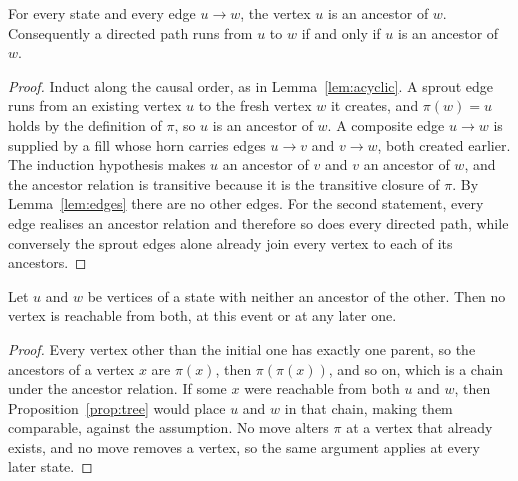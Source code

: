 \begin{proposition}
\label{prop:tree}
For every state and every edge $u \to w$, the vertex $u$ is an ancestor of $w$.
Consequently a directed path runs from $u$ to $w$ if and only if $u$ is an ancestor of $w$.
\end{proposition}

\begin{proof}
Induct along the causal order, as in Lemma~\ref{lem:acyclic}.
A sprout edge runs from an existing vertex $u$ to the fresh vertex $w$ it creates, and $\pi(w) = u$ holds by the definition of $\pi$, so $u$ is an ancestor of $w$.
A composite edge $u \to w$ is supplied by a fill whose horn carries edges $u \to v$ and $v \to w$, both created earlier.
The induction hypothesis makes $u$ an ancestor of $v$ and $v$ an ancestor of $w$, and the ancestor relation is transitive because it is the transitive closure of $\pi$.
By Lemma~\ref{lem:edges} there are no other edges.
For the second statement, every edge realises an ancestor relation and therefore so does every directed path, while conversely the sprout edges alone already join every vertex to each of its ancestors.
\end{proof}

\begin{corollary}
\label{cor:nocommonfuture}
Let $u$ and $w$ be vertices of a state with neither an ancestor of the other.
Then no vertex is reachable from both, at this event or at any later one.
\end{corollary}

\begin{proof}
Every vertex other than the initial one has exactly one parent, so the ancestors of a vertex $x$ are $\pi(x)$, then $\pi(\pi(x))$, and so on, which is a chain under the ancestor relation.
If some $x$ were reachable from both $u$ and $w$, then Proposition~\ref{prop:tree} would place $u$ and $w$ in that chain, making them comparable, against the assumption.
No move alters $\pi$ at a vertex that already exists, and no move removes a vertex, so the same argument applies at every later state.
\end{proof}


